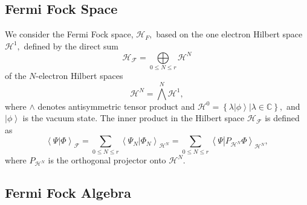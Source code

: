 \documentclass[aps,preprint]{revtex4}%
\begin{document}
\subsection{Fermi Fock Space \label{Fermi Fock Space}}

We consider the Fermi Fock space, $\mathcal{H}_{F},$ based on the one electron
Hilbert space $\mathcal{H}^{1},$ defined by the direct sum
\begin{equation}
\mathcal{H}_{\mathcal{F}}=\underset{0\leq N\leq r}{\bigoplus}\mathcal{H}^{N}%
\end{equation}
of the $N$-electron Hilbert spaces
\begin{equation}
\mathcal{H}^{N}=\bigwedge\limits^{N}\mathcal{H}^{1},
\end{equation}
where $\wedge$ denotes antisymmetric tensor product and $\mathcal{H}%
^{0}=\left\{  \left.  \lambda\left\vert \phi\right\rangle \right\vert
\lambda\in\mathbb{C}\right\}  ,$ and $\left\vert \phi\right\rangle $ is the
vacuum state. The inner product in the Hilbert space $\mathcal{H}%
_{\mathcal{F}}$ is defined as
\begin{equation}
\left\langle \Psi\left\vert \Phi\right.  \right\rangle _{\mathcal{F}}%
=\sum_{0\leq N\leq r}\left\langle \Psi_{N}\left\vert \Phi_{N}\right.
\right\rangle _{\mathcal{H}^{N}}=\sum_{0\leq N\leq r}\left\langle
\Psi\left\vert P_{\mathcal{H}^{N}}\Phi\right.  \right\rangle _{\mathcal{H}%
^{N}},
\end{equation}
where $P_{\mathcal{H}^{N}}$ is the orthogonal projector onto $\mathcal{H}%
^{N}.$

\subsection{Fermi Fock Algebra \label{Fermi Fock Alg}}
\end{document}
